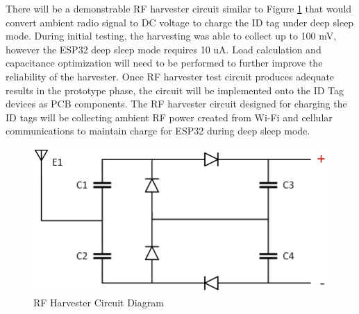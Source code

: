 There will be a demonstrable RF harvester circuit similar to Figure \ref{rf_c} that would convert ambient radio signal to DC voltage to charge the ID tag under deep sleep mode. During initial testing, the harvesting was able to collect up to 100 mV, however the ESP32 deep sleep mode requires 10 uA. Load calculation and capacitance optimization will need to be performed to further improve the reliability of the harvester. Once RF harvester test circuit produces adequate results in the prototype phase, the circuit will be implemented onto the ID Tag devices as PCB components. The RF harvester circuit designed for charging the ID tags will be collecting ambient RF power created from Wi-Fi and cellular communications to maintain charge for ESP32 during deep sleep mode.

\medskip
\begin{figure}[H]
\centering
    \includegraphics[scale=0.5]{./images/rf_circuit.png}
    \caption{RF Harvester Circuit Diagram}
    \label{rf_c}
\end{figure}

\pagebreak
